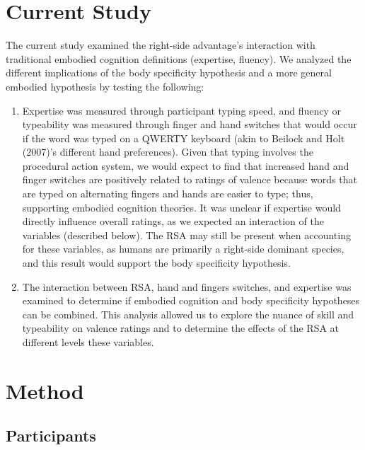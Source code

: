 \documentclass[
  english,
  man,mask]{apa7}
\providecommand{\tightlist}{%
  \setlength{\itemsep}{0pt}\setlength{\parskip}{0pt}}
\begin{document}
\hypertarget{current-study}{%
\section{Current Study}\label{current-study}}

The current study examined the right-side advantage's interaction with traditional embodied cognition definitions (expertise, fluency). We analyzed the different implications of the body specificity hypothesis and a more general embodied hypothesis by testing the following:

\begin{enumerate}
\def\labelenumi{\arabic{enumi})}
\tightlist
\item
  Expertise was measured through participant typing speed, and fluency or typeability was measured through finger and hand switches that would occur if the word was typed on a QWERTY keyboard (akin to Beilock and Holt (2007)'s different hand preferences). Given that typing involves the procedural action system, we would expect to find that increased hand and finger switches are positively related to ratings of valence because words that are typed on alternating fingers and hands are easier to type; thus, supporting embodied cognition theories. It was unclear if expertise would directly influence overall ratings, as we expected an interaction of the variables (described below). The RSA may still be present when accounting for these variables, as humans are primarily a right-side dominant species, and this result would support the body specificity hypothesis.
\item
  The interaction between RSA, hand and fingers switches, and expertise was examined to determine if embodied cognition and body specificity hypotheses can be combined. This analysis allowed us to explore the nuance of skill and typeability on valence ratings and to determine the effects of the RSA at different levels these variables.
\end{enumerate}

\hypertarget{method}{%
\section{Method}\label{method}}

\hypertarget{participants}{%
\subsection{Participants}\label{participants}}
\end{document}
